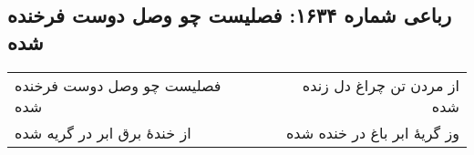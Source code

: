 \begin{center}
\section*{رباعی شماره ۱۶۳۴: فصلیست چو وصل دوست فرخنده شده}
\label{sec:1634}
\begin{longtable}{l p{0.5cm} r}
فصلیست چو وصل دوست فرخنده شده
&&
از مردن تن چراغ دل زنده شده
\\
از خندهٔ برق ابر در گریه شده
&&
وز گریهٔ ابر باغ در خنده شده
\\
\end{longtable}
\end{center}

